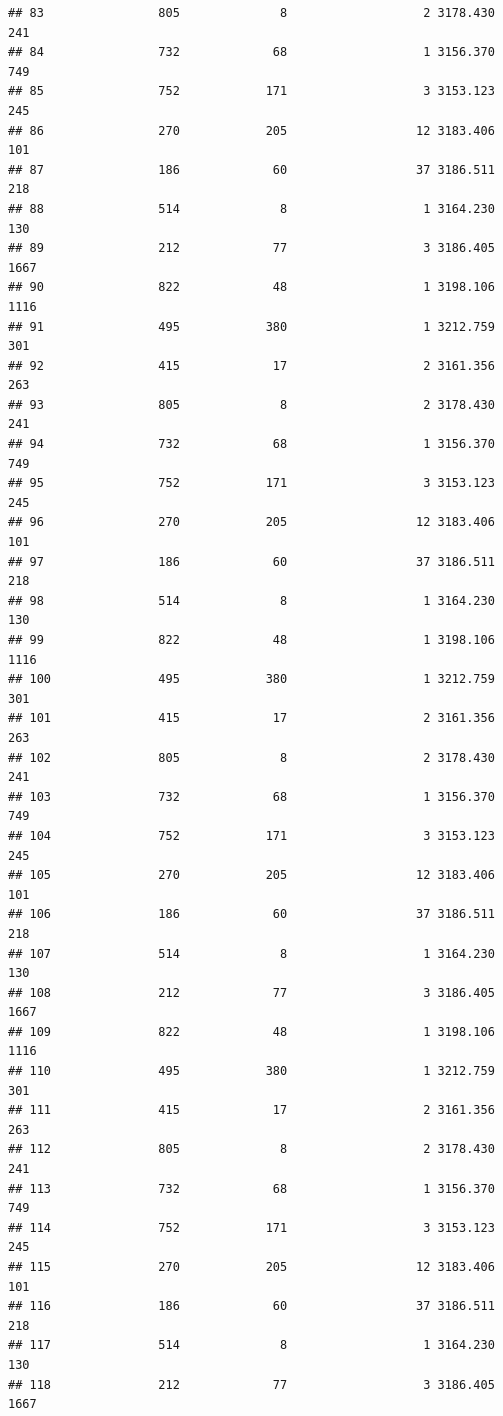 \documentclass[
]{article}
\begin{document}
\begin{verbatim}
## 83                805              8                   2 3178.430  241
## 84                732             68                   1 3156.370  749
## 85                752            171                   3 3153.123  245
## 86                270            205                  12 3183.406  101
## 87                186             60                  37 3186.511  218
## 88                514              8                   1 3164.230  130
## 89                212             77                   3 3186.405 1667
## 90                822             48                   1 3198.106 1116
## 91                495            380                   1 3212.759  301
## 92                415             17                   2 3161.356  263
## 93                805              8                   2 3178.430  241
## 94                732             68                   1 3156.370  749
## 95                752            171                   3 3153.123  245
## 96                270            205                  12 3183.406  101
## 97                186             60                  37 3186.511  218
## 98                514              8                   1 3164.230  130
## 99                822             48                   1 3198.106 1116
## 100               495            380                   1 3212.759  301
## 101               415             17                   2 3161.356  263
## 102               805              8                   2 3178.430  241
## 103               732             68                   1 3156.370  749
## 104               752            171                   3 3153.123  245
## 105               270            205                  12 3183.406  101
## 106               186             60                  37 3186.511  218
## 107               514              8                   1 3164.230  130
## 108               212             77                   3 3186.405 1667
## 109               822             48                   1 3198.106 1116
## 110               495            380                   1 3212.759  301
## 111               415             17                   2 3161.356  263
## 112               805              8                   2 3178.430  241
## 113               732             68                   1 3156.370  749
## 114               752            171                   3 3153.123  245
## 115               270            205                  12 3183.406  101
## 116               186             60                  37 3186.511  218
## 117               514              8                   1 3164.230  130
## 118               212             77                   3 3186.405 1667

\end{verbatim}
\end{document}
